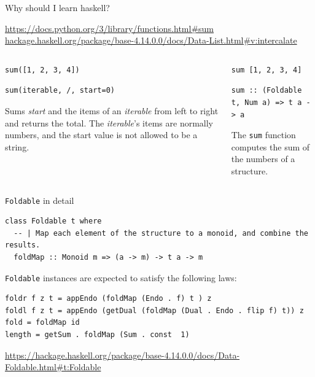 \documentclass[8pt]{beamer}
\begin{document}
\begin{frame}[fragile]{Why should I learn haskell?}

{\tiny \url{https://docs.python.org/3/library/functions.html#sum}}
{\tiny \url{hackage.haskell.org/package/base-4.14.0.0/docs/Data-List.html#v:intercalate}}

\begin{columns}%
\begin{column}{.48\textwidth}
\begin{verbatim}
sum([1, 2, 3, 4])
\end{verbatim}
\begin{verbatim}
sum(iterable, /, start=0)
\end{verbatim}

Sums \emph{start} and the items of an \emph{iterable} from left to right and
returns the total. The \emph{iterable}’s items are normally numbers, and the start
value is not allowed to be a string.


\end{column}
%
\begin{column}{.48\textwidth}
\begin{verbatim}
sum [1, 2, 3, 4]
\end{verbatim}

\begin{verbatim}
sum :: (Foldable t, Num a) => t a -> a
\end{verbatim}

The \verb|sum| function computes the sum of the numbers of a structure.

\end{column}
\end{columns}
\end{frame}

\begin{frame}[fragile]{\texttt{Foldable} in detail}


\begin{verbatim}
class Foldable t where
  -- | Map each element of the structure to a monoid, and combine the results.
  foldMap :: Monoid m => (a -> m) -> t a -> m
\end{verbatim}

\verb|Foldable| instances are expected to satisfy the following laws:

\begin{verbatim}
foldr f z t = appEndo (foldMap (Endo . f) t ) z
foldl f z t = appEndo (getDual (foldMap (Dual . Endo . flip f) t)) z
fold = foldMap id
length = getSum . foldMap (Sum . const  1)
\end{verbatim}
{\tiny \url{https://hackage.haskell.org/package/base-4.14.0.0/docs/Data-Foldable.html#t:Foldable}}
\end{frame}
\end{document}

